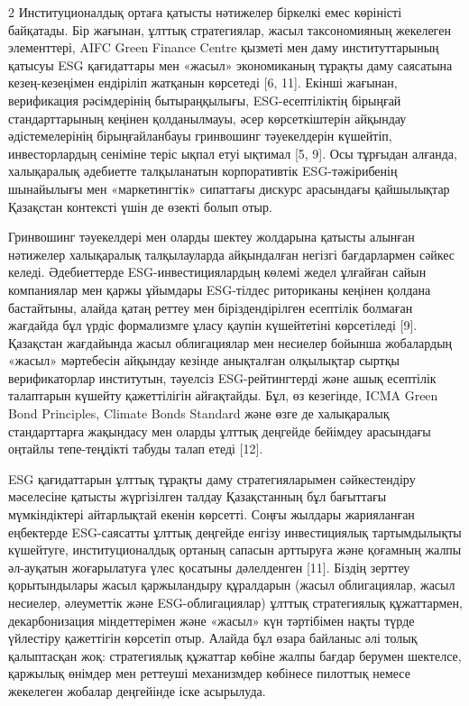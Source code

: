 \begin{multicols}{2}
Институционалдық ортаға қатысты нәтиже­лер біркелкі емес көріністі
байқатады. Бір жағынан, ұлттық стратегиялар, жасыл таксономияның
жекелеген элементтері, AIFC Green Finance Centre қызметі мен даму
институттарының қатысуы ESG қағидаттары мен «жасыл» экономиканың тұрақты
даму саясатына кезең-кезеңімен ендіріліп жатқанын көрсетеді {[}6, 11{]}.
Екінші жағынан, верификация рәсімдерінің бытыраңқылығы, ESG-есептіліктің
бірыңғай стандарттарының кеңінен қолданылмауы, әсер көрсеткіштерін
айқындау әдістемелерінің бірыңғайланбауы гринвошинг тәуекелдерін
күшейтіп, инвесторлардың сеніміне теріс ықпал етуі ықтимал {[}5, 9{]}.
Осы тұрғыдан алғанда, халықаралық әдебиетте талқыланатын корпоративтік
ESG-тәжірибенің шынайылығы мен «маркетингтік» сипаттағы дискурс
арасындағы қайшылықтар Қазақстан контексті үшін де өзекті болып отыр.

Гринвошинг тәуекелдері мен оларды шектеу жолдарына қатысты алынған
нәтижелер халықаралық талқылауларда айқындалған негізгі бағдарлармен
сәйкес келеді. Әдебиеттерде ESG-инвестициялардың көлемі жедел ұлғайған
сайын компаниялар мен қаржы ұйымдары ESG-тілдес риториканы кеңінен
қолдана бастайтыны, алайда қатаң реттеу мен біріздендірілген есептілік
болмаған жағдайда бұл үрдіс формализмге ұласу қаупін күшейтетіні
көрсетіледі {[}9{]}. Қазақстан жағдайында жасыл облигациялар мен
несиелер бойынша жобалардың «жасыл» мәртебесін айқындау кезінде
анықталған олқылықтар сыртқы верификаторлар институтын, тәуелсіз
ESG-рейтингтерді және ашық есептілік талаптарын күшейту қажеттілігін
айғақтайды. Бұл, өз кезегінде, ICMA Green Bond Principles, Climate Bonds
Standard және өзге де халықаралық стандарттарға жақындасу мен оларды
ұлттық деңгейде бейімдеу арасындағы оңтайлы тепе-теңдікті табуды талап
етеді {[}12{]}.

ESG қағидаттарын ұлттық тұрақты даму стратегияларымен сәйкестендіру
мәселесіне қатысты жүргізілген талдау Қазақстанның бұл бағыттағы
мүмкіндіктері айтарлықтай екенін көрсетті. Соңғы жылдары жарияланған
еңбектерде ESG-саясатты ұлттық деңгейде енгізу инвестициялық
тартымдылықты күшейтуге, институционалдық ортаның сапасын арттыруға және
қоғамның жалпы әл-ауқатын жоғарылатуға үлес қосатыны дәлелденген
{[}11{]}. Біздің зерттеу қорытындылары жасыл қаржыландыру құралдарын
(жасыл облигациялар, жасыл несиелер, әлеуметтік және ESG-облигациялар)
ұлттық стратегиялық құжаттармен, декарбонизация міндеттерімен және
«жасыл» күн тәртібімен нақты түрде үйлестіру қажеттігін көрсетіп отыр.
Алайда бұл өзара байланыс әлі толық қалыптасқан жоқ: стратегиялық
құжаттар көбіне жалпы бағдар берумен шектелсе, қаржылық өнімдер мен
реттеуші механизмдер көбінесе пилоттық немесе жекелеген жобалар
деңгейінде іске асырылуда.


\end{multicols}
